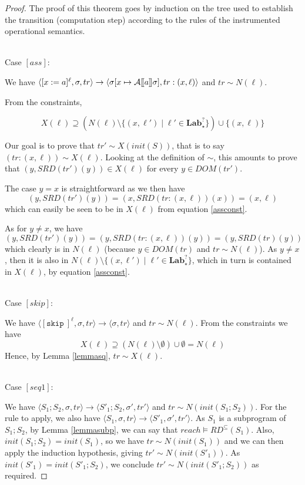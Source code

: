 \documentclass[a4wide,12pt]{article}
\theoremstyle{definition}
\theoremstyle{plain}
\theoremstyle{remark}
\def\A#1{\mathcal{A}[\hspace{-1pt}[#1]\hspace{-1pt}]}
\def\const#1{\mathopen{\langle}#1\mathclose{\rangle}} %
\def\pair#1{\const{#1}}
\def\Lab {\mathbf{Lab}}
\def\skip {\texttt{skip}\ }
\begin{document}
\begin{proof}
The proof of this theorem goes by induction on the tree used to establish
the transition (computation step) according to the rules of the instrumented operational semantics.

~\\
Case $[ass]$:

We have $\pair{[x := a]^\ell, \sigma, tr} \to \pair{\sigma[x\mapsto\A{a}\sigma], tr:(x,\ell)}$
and $tr \sim N(\ell)$. 


From the constraints,

\begin{equation}\label{assconst}
X(\ell) \supseteq (N(\ell) \setminus \{(x,\ell') \mid \ell' \in \Lab_\star^?\}) \cup \{(x,\ell)\}
\end{equation}

Our goal is to prove that $tr' \sim X(init(S))$, that is to say $(tr:(x,\ell)) \sim X(\ell)$.
Looking at the definition of $\sim$,
this amounts to prove that $(y,SRD(tr')(y)) \in X(\ell)$ for every $y \in DOM(tr')$.

The case $y=x$ is straightforward as
we then have \[(y,SRD(tr')(y)) = (x,SRD(tr:(x,\ell))(x)) = (x,\ell)\] which can easily be seen to be in $X(\ell)$ from equation \ref{assconst}.

As for $y\neq x$, we have \[(y,SRD(tr')(y)) = (y,SRD(tr:(x,\ell))(y)) = (y,SRD(tr)(y))\] which clearly is in $N(\ell)$ (because $y \in DOM(tr)$ and $tr \sim N(\ell)$).
As $y\neq x$, then it is also in $N(\ell) \setminus \{(x,\ell') \mid \ell' \in \Lab_\star^?\}$, which in turn is contained in $X(\ell)$, by equation \ref{assconst}.

~\\
Case $[skip]$:

We have $\pair{[\skip]^\ell, \sigma, tr} \to \pair{\sigma, tr}$
and $tr \sim N(\ell)$. 
From the constraints we have
\[X(\ell) \supseteq (N(\ell) \setminus \emptyset) \cup \emptyset = N(\ell)\]
Hence, by Lemma \ref{lemmasq}, $tr \sim X(\ell)$.

~\\
Case $[seq1]$:

We have $\pair{S_1;S_2,\sigma,tr} \to \pair{S'_1;S_2,\sigma',tr'}$ and $tr \sim N(init(S_1;S_2))$.
For the rule to apply, we also have $\pair{S_1,\sigma,tr} \to \pair{S'_1,\sigma',tr'}$.
As $S_1$ is a subprogram of $S_1;S_2$, by Lemma \ref{lemmasubp},
we can say that $reach \models RD^{\subseteq}(S_1)$. Also, $init(S_1;S_2) = init(S_1)$, so we have
$tr \sim N(init(S_1))$ and we can then apply the induction hypothesis, giving $tr' \sim  N(init(S'_1))$.
As $init(S'_1) = init(S'_1;S_2)$, we conclude $tr' \sim N(init(S'_1;S_2))$ as required.


\end{proof}
\end{document}
